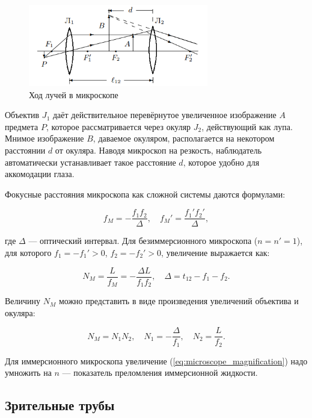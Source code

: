\begin{figure}[h]
\centering
\includegraphics[width=0.7\textwidth]{images/microscope_scheme.png}
\caption{Ход лучей в микроскопе}
\label{fig:microscope}
\end{figure}

Объектив $J_1$ даёт действительное перевёрнутое увеличенное изображение $A$ предмета $P$, которое рассматривается через окуляр $J_2$, действующий как лупа. Мнимое изображение $B$, даваемое окуляром, располагается на некотором расстоянии $d$ от окуляра. Наводя микроскоп на резкость, наблюдатель автоматически устанавливает такое расстояние $d$, которое удобно для аккомодации глаза.

Фокусные расстояния микроскопа как сложной системы даются формулами:

\begin{equation}
f_M = -\frac{f_1 f_2}{\Delta}, \quad f_M' = \frac{f_1' f_2'}{\Delta},
\label{eq:microscope_focal}
\end{equation}

где $\Delta$ — оптический интервал. Для безиммерсионного микроскопа ($n = n' = 1$), для которого $f_1 = -f_1' > 0$, $f_2 = -f_2' > 0$, увеличение выражается как:

\begin{equation}
N_M = \frac{L}{f_M} = -\frac{\Delta L}{f_1 f_2}, \quad \Delta = t_{12} - f_1 - f_2.
\label{eq:microscope_magnification}
\end{equation}

Величину $N_M$ можно представить в виде произведения увеличений объектива и окуляра:

\begin{equation}
N_M = N_1 N_2, \quad N_1 = -\frac{\Delta}{f_1}, \quad N_2 = \frac{L}{f_2}.
\label{eq:components}
\end{equation}

Для иммерсионного микроскопа увеличение (\ref{eq:microscope_magnification}) надо умножить на $n$ — показатель преломления иммерсионной жидкости.

\subsection*{Зрительные трубы}

